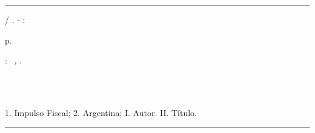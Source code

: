 \documentclass[a4paper, 12pt, openany, oneside, brazil]{abntex2}
\renewcommand{\imprimircapa}{%
	    \begin{capa}%
	    \center{\ABNTEXchapterfont\large\imprimirinstituicao}
	    
	    \vspace*{\fill}
	    
	    \center{\ABNTEXchapterfont\large\imprimirautor}
	    
	    \vspace*{\fill}
	    {\ABNTEXchapterfont\bfseries\LARGE\imprimirtitulo}
	    \vspace*{\fill}
	    
	    {\large\imprimirlocal}
	    \par
	    {\large\imprimirdata}
	\vspace*{1cm}
	\end{capa}
	}
\begin{document}
	\frenchspacing

	\pretextual


	\imprimircapa
	\imprimirfolhaderosto

	\begin{fichacatalografica}
	    \vspace*{15cm} %
	    \hrule %
	    \begin{center} %
	    \begin{minipage}[c]{12cm} %
	    
	    \imprimirautor
	    
	    \hspace{0.5cm} \imprimirtitulo / \imprimirautor. -
	    \imprimirlocal: \imprimirdata

	    \hspace{0.5cm} \pageref{LastPage} p.

	\hspace{0.5cm}
	\parbox[t]{\textwidth}{\imprimirtipotrabalho: \ \imprimirinstituicao, \imprimirdata.}\\

	\hspace{0.5cm} \imprimirorientadorRotulo \ \imprimirorientador

	    \hspace{0.5cm}
	1. Impulso Fiscal;
	2. Argentina;
	I. Autor.
	II. Título.
	    \end{minipage}
	    \end{center}
	    \hrule
	\end{fichacatalografica}
\end{document}
